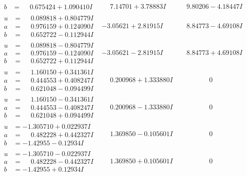 \documentclass[1p]{elsarticle_modified}
\theoremstyle{definition}
\begin{document}
$$\begin{array}{c|c|c}
\begin{aligned}
b &= \phantom{-}0.675424 + 1.090410 I\end{aligned}
 & \phantom{-}7.14701 + 3.78883 I & \phantom{-}9.80206 - 4.18447 I \\ \hline\begin{aligned}
u &= \phantom{-}0.089818 + 0.804779 I \\
a &= \phantom{-}0.976159 + 0.124090 I \\
b &= \phantom{-}0.652722 - 0.112944 I\end{aligned}
 & -3.05621 + 2.81915 I & \phantom{-}8.84773 - 4.69108 I \\ \hline\begin{aligned}
u &= \phantom{-}0.089818 - 0.804779 I \\
a &= \phantom{-}0.976159 - 0.124090 I \\
b &= \phantom{-}0.652722 + 0.112944 I\end{aligned}
 & -3.05621 - 2.81915 I & \phantom{-}8.84773 + 4.69108 I \\ \hline\begin{aligned}
u &= \phantom{-}1.160150 + 0.341361 I \\
a &= \phantom{-}0.444553 + 0.408247 I \\
b &= \phantom{-}0.621048 - 0.094499 I\end{aligned}
 & \phantom{-}0.200968 + 1.333880 I & \phantom{-0.000000 } 0 \\ \hline\begin{aligned}
u &= \phantom{-}1.160150 - 0.341361 I \\
a &= \phantom{-}0.444553 - 0.408247 I \\
b &= \phantom{-}0.621048 + 0.094499 I\end{aligned}
 & \phantom{-}0.200968 - 1.333880 I & \phantom{-0.000000 } 0 \\ \hline\begin{aligned}
u &= -1.305710 + 0.022937 I \\
a &= \phantom{-}0.482228 + 0.442327 I \\
b &= -1.42955 - 0.12934 I\end{aligned}
 & \phantom{-}1.369850 - 0.105601 I & \phantom{-0.000000 } 0 \\ \hline\begin{aligned}
u &= -1.305710 - 0.022937 I \\
a &= \phantom{-}0.482228 - 0.442327 I \\
b &= -1.42955 + 0.12934 I\end{aligned}
 & \phantom{-}1.369850 + 0.105601 I & \phantom{-0.000000 } 0 \\ \hline\begin{aligned}

\end{aligned}
\end{array}$$
\end{document}
